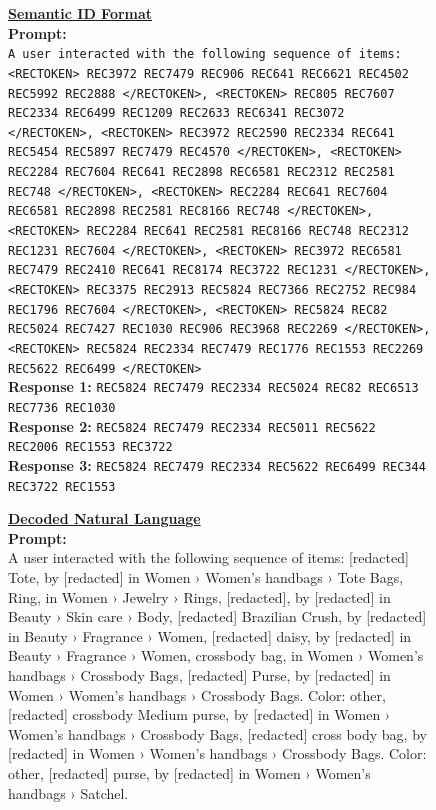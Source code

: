 \documentclass[]{fairmeta}
\begin{document}
\begin{figure}[H]
  \begin{tcolorbox}[title={\textbf{Case Study: Beam Search}},
                    colback=white, colframe=black!70]
  \begin{minipage}[t]{0.48\textwidth}
  \textbf{\underline{Semantic ID Format}}\\[0.5em]
  \textbf{Prompt:}\\
  {\footnotesize\texttt{A user interacted with the following sequence of items: <RECTOKEN> REC3972 REC7479 REC906 REC641 REC6621 REC4502 REC5992 REC2888 </RECTOKEN>, <RECTOKEN> REC805 REC7607 REC2334 REC6499 REC1209 REC2633 REC6341 REC3072 </RECTOKEN>, <RECTOKEN> REC3972 REC2590 REC2334 REC641 REC5454 REC5897 REC7479 REC4570 </RECTOKEN>, <RECTOKEN> REC2284 REC7604 REC641 REC2898 REC6581 REC2312 REC2581 REC748 </RECTOKEN>, <RECTOKEN> REC2284 REC641 REC7604 REC6581 REC2898 REC2581 REC8166 REC748 </RECTOKEN>, <RECTOKEN> REC2284 REC641 REC2581 REC8166 REC748 REC2312 REC1231 REC7604 </RECTOKEN>, <RECTOKEN> REC3972 REC6581 REC7479 REC2410 REC641 REC8174 REC3722 REC1231 </RECTOKEN>, <RECTOKEN> REC3375 REC2913 REC5824 REC7366 REC2752 REC984 REC1796 REC7604 </RECTOKEN>, <RECTOKEN> REC5824 REC82 REC5024 REC7427 REC1030 REC906 REC3968 REC2269 </RECTOKEN>, <RECTOKEN> REC5824 REC2334 REC7479 REC1776 REC1553 REC2269 REC5622 REC6499 </RECTOKEN>}}\\[0.3em]
  \textbf{Response 1:} {\footnotesize\texttt{REC5824 REC7479 REC2334 REC5024 REC82 REC6513 REC7736 REC1030}}\\
  \textbf{Response 2:} {\footnotesize\texttt{REC5824 REC7479 REC2334 REC5011 REC5622 REC2006 REC1553 REC3722}}\\
  \textbf{Response 3:} {\footnotesize\texttt{REC5824 REC7479 REC2334 REC5622 REC6499 REC344 REC3722 REC1553}}\\
  \end{minipage}
  \hfill
  \begin{minipage}[t]{0.48\textwidth}
  \textbf{\underline{Decoded Natural Language}}\\[0.5em]
  \textbf{Prompt:}\\
  {\footnotesize A user interacted with the following sequence of items: [redacted] Tote, by [redacted] in Women › Women's handbags › Tote Bags, Ring, in Women › Jewelry › Rings, [redacted], by [redacted] in Beauty › Skin care › Body, [redacted] Brazilian Crush, by [redacted] in Beauty › Fragrance › Women, [redacted] daisy, by [redacted] in Beauty › Fragrance › Women, crossbody bag, in Women › Women's handbags › Crossbody Bags, [redacted] Purse, by [redacted] in Women › Women's handbags › Crossbody Bags. Color: other, [redacted] crossbody Medium purse, by [redacted] in Women › Women's handbags › Crossbody Bags, [redacted] cross body bag, by [redacted] in Women › Women's handbags › Crossbody Bags. Color: other, [redacted] purse, by [redacted] in Women › Women's handbags › Satchel.}\\[0.3em]

\end{minipage}
\end{tcolorbox}
\end{figure}
\end{document}
